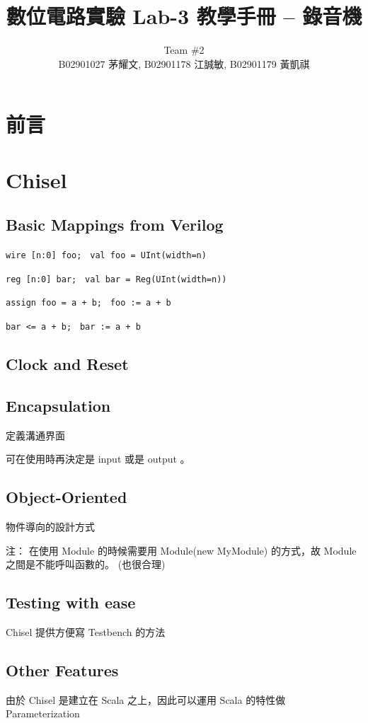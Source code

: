 \documentclass[12pt, a4paper]{article}
\title{數位電路實驗 Lab-3 教學手冊 -- 錄音機 \vspace{-0.2cm}}
\author{Team \#2 \\ B02901027 茅耀文, B02901178 江誠敏, B02901179 黃凱祺}
\begin{document}
\maketitle

\setcounter{section}{-1}
\section{前言}

\section{Chisel}

\subsection{Basic Mappings from Verilog}
{\tt wire [n:0] foo; } {\tt val foo = UInt(width=n) }

{\tt reg [n:0] bar; } {\tt val bar = Reg(UInt(width=n)) }

{\tt assign foo = a + b; } {\tt foo := a + b }

{\tt bar <= a + b; } {\tt bar := a + b }
\subsection{Clock and Reset}
\subsection{Encapsulation}
定義溝通界面

可在使用時再決定是 input 或是 output 。
\subsection{Object-Oriented}
物件導向的設計方式

注： 在使用 Module 的時候需要用 Module(new MyModule) 的方式，故
Module 之間是不能呼叫函數的。 (也很合理)

\subsection{Testing with ease}
Chisel 提供方便寫 Testbench 的方法

\subsection{Other Features}
由於 Chisel 是建立在 Scala 之上，因此可以運用 Scala 的特性做 Parameterization
\end{document}
